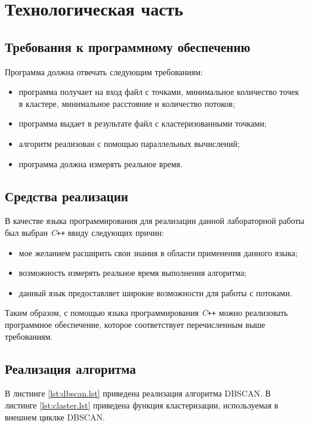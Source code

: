 \chapter{Технологическая часть}

\section{Требования к программному обеспечению}

Программа должна отвечать следующим требованиям:
\begin{itemize}[label=---]
	\item программа получает на вход файл с точками, минимальное количество точек в кластере, минимальное расстояние и количество потоков;
	\item программа выдает в результате файл с кластеризованными точками;
	\item алгоритм реализован с помощью параллельных вычислений;
	\item программа должна измерять реальное время.
\end{itemize}

\section{Средства реализации}

В качестве языка программирования для реализации данной лабораторной работы был выбран \textit{C\texttt{++}} ввиду следующих причин:
\begin{itemize}[label=---]
	\item мое желанием расширить свои знания в области применения данного языка;
	\item возможность измерять реальное время выполнения алгоритма;
	\item данный язык предоставляет широкие возможности для работы с потоками.
\end{itemize}

Таким образом, с помощью языка программирования \textit{C\texttt{++}} можно реализовать программное обеспечение, которое соответствует перечисленным выше требованиям.

\section{Реализация алгоритма}

В листинге \ref{lst:dbscan.lst} приведена реализация алгоритма DBSCAN.
В листинге \ref{lst:claster.lst} приведена функция кластеризации, используемая в внешнем циклке DBSCAN.
\clearpage
{}
\clearpage	
{}
\clearpage

